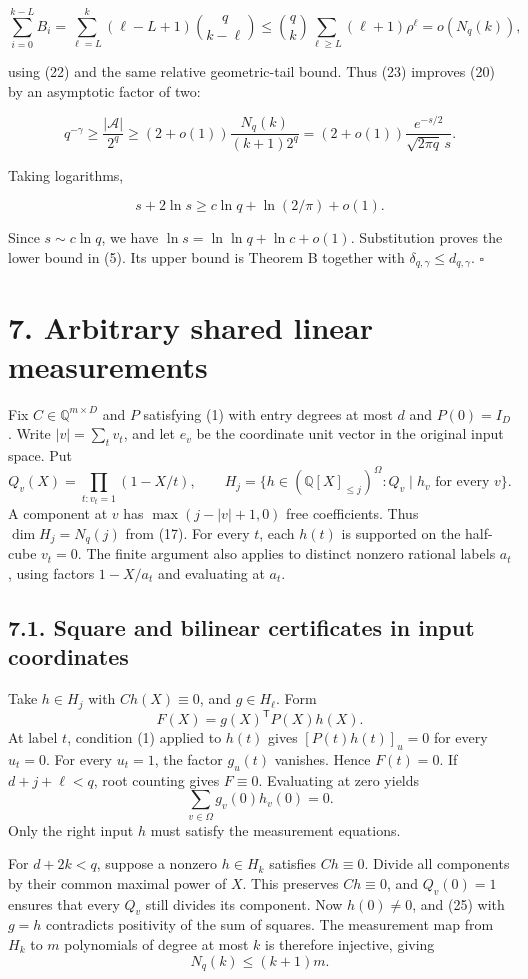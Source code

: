 \documentclass[
  10pt,
]{article}
\begin{document}
\[
 \sum_{i=0}^{k-L}B_i
 =\sum_{\ell=L}^{k}(\ell-L+1)\binom q{k-\ell}
 \le\binom qk\sum_{\ell\ge L}(\ell+1)\rho^\ell
 =o(N_q(k)),
\]

using (22) and the same relative geometric-tail bound. Thus (23) improves (20) by an asymptotic factor of two:

\[
 q^{-\gamma}\ge\frac{|\mathcal A|}{2^q}
 \ge(2+o(1))\frac{N_q(k)}{(k+1)2^q}
 =(2+o(1))\frac{e^{-s/2}}{\sqrt{2\pi q}\,s}.
\]

Taking logarithms,

\[
 s+2\ln s\ge c\ln q+\ln(2/\pi)+o(1).
\]

Since \(s\sim c\ln q\), we have \(\ln s=\ln\ln q+\ln c+o(1)\). Substitution proves the lower bound in (5). Its upper bound is Theorem B together with \(\delta_{q,\gamma}\le d_{q,\gamma}\). \(\square\)


\section{7. Arbitrary shared linear measurements}

Fix \(C\in\mathbb Q^{m\times D}\) and \(P\) satisfying (1) with entry degrees at most \(d\) and \(P(0)=I_D\).
Write \(|v|=\sum_t v_t\), and let \(e_v\) be the coordinate unit vector in the original input space. Put
\[
 Q_v(X)=\prod_{t:v_t=1}(1-X/t),\qquad
 H_j=\{h\in(\mathbb Q[X]_{\le j})^\Omega: Q_v\mid h_v \text{ for every }v\}.
\]
A component at \(v\) has \(\max(j-|v|+1,0)\) free coefficients. Thus \(\dim H_j=N_q(j)\) from (17).
For every \(t\), each \(h(t)\) is supported on the half-cube \(v_t=0\). The finite argument also applies to distinct nonzero rational labels \(a_t\), using factors \(1-X/a_t\) and evaluating at \(a_t\).

\subsection{7.1. Square and bilinear certificates in input coordinates}

Take \(h\in H_j\) with \(Ch(X)\equiv0\), and \(g\in H_\ell\). Form
\[
 F(X)=g(X)^{\mathsf T}P(X)h(X).
\]
At label \(t\), condition (1) applied to \(h(t)\) gives \([P(t)h(t)]_u=0\) for every \(u_t=0\). For every \(u_t=1\), the factor \(g_u(t)\) vanishes. Hence \(F(t)=0\). If \(d+j+\ell<q\), root counting gives \(F\equiv0\). Evaluating at zero yields
\[
 \sum_{v\in\Omega}g_v(0)h_v(0)=0. \tag{25}
\]
Only the right input \(h\) must satisfy the measurement equations.

For \(d+2k<q\), suppose a nonzero \(h\in H_k\) satisfies \(Ch\equiv0\).
Divide all components by their common maximal power of \(X\). This preserves \(Ch\equiv0\), and \(Q_v(0)=1\) ensures that every \(Q_v\) still divides its component. Now \(h(0)\ne0\), and (25) with \(g=h\) contradicts positivity of the sum of squares. The measurement map from \(H_k\) to \(m\) polynomials of degree at most \(k\) is therefore injective, giving
\[
 N_q(k)\le (k+1)m. \tag{26}
\]
\end{document}
